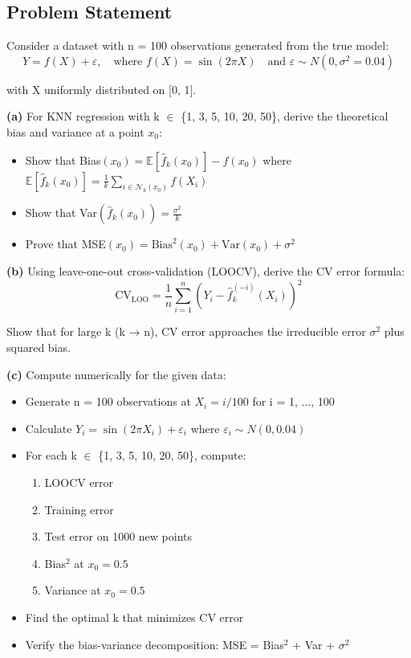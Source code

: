 \documentclass[12pt]{article}
\begin{document}
\subsection{Problem Statement}

Consider a dataset with n = 100 observations generated from the true model:
\[
Y = f(X) + \varepsilon, \quad \text{where } f(X) = \sin(2\pi X) \quad \text{and } \varepsilon \sim N(0, \sigma^2 = 0.04)
\]

with X uniformly distributed on [0, 1].

\textbf{(a)} For KNN regression with k $\in$ \{1, 3, 5, 10, 20, 50\}, derive the theoretical bias and variance at a point $x_0$:
\begin{itemize}
    \item Show that Bias$(x_0) = \mathbb{E}[\hat{f}_k(x_0)] - f(x_0)$ where $\mathbb{E}[\hat{f}_k(x_0)] = \frac{1}{k}\sum_{i \in \mathcal{N}_k(x_0)} f(X_i)$
    \item Show that Var$(\hat{f}_k(x_0)) = \frac{\sigma^2}{k}$
    \item Prove that MSE$(x_0) = \text{Bias}^2(x_0) + \text{Var}(x_0) + \sigma^2$
\end{itemize}

\textbf{(b)} Using leave-one-out cross-validation (LOOCV), derive the CV error formula:
\[
\text{CV}_{\text{LOO}} = \frac{1}{n}\sum_{i=1}^n (Y_i - \hat{f}_{k}^{(-i)}(X_i))^2
\]

Show that for large k (k → n), CV error approaches the irreducible error $\sigma^2$ plus squared bias.

\textbf{(c)} Compute numerically for the given data:
\begin{itemize}
    \item Generate n = 100 observations at $X_i = i/100$ for i = 1, ..., 100
    \item Calculate $Y_i = \sin(2\pi X_i) + \varepsilon_i$ where $\varepsilon_i \sim N(0, 0.04)$
    \item For each k $\in$ \{1, 3, 5, 10, 20, 50\}, compute:
    \begin{enumerate}
        \item LOOCV error
        \item Training error
        \item Test error on 1000 new points
        \item Bias$^2$ at $x_0 = 0.5$
        \item Variance at $x_0 = 0.5$
    \end{enumerate}
    \item Find the optimal k that minimizes CV error
    \item Verify the bias-variance decomposition: MSE = Bias$^2$ + Var + $\sigma^2$
\end{itemize}
\end{document}
